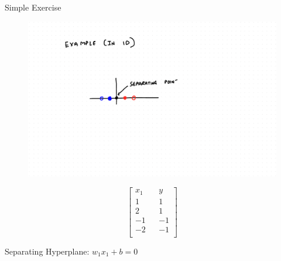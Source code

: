\documentclass{beamer}
\begin{document}
\begin{frame}{Simple Exercise}
\begin{multicols}{2}

\begin{figure}
\includegraphics[scale = 0.25]{SVM/Svm-21.pdf}
\end{figure} \break
\vspace{10cm}
\begin{equation*}
\begin{bmatrix}
x_{1} && y \\
1 && 1\\
2 && 1\\
-1 && -1\\
-2 && -1\\
\end{bmatrix}
\end{equation*}

\end{multicols}
Separating Hyperplane: $w_{1}x_{1} + b = 0$

\end{frame}
\end{document}
